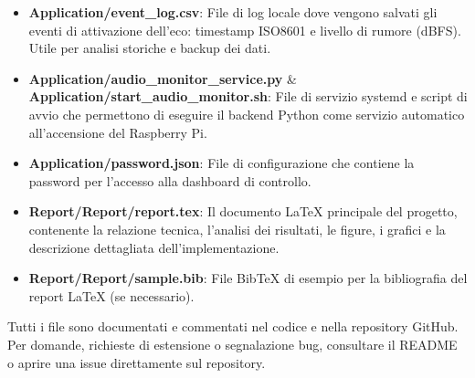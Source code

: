 \documentclass[fleqn,10pt]{SelfArx} %
\begin{document}
\begin{itemize}
	\item \textbf{Application/event\_log.csv}: %
	File di log locale dove vengono salvati gli eventi di attivazione dell'eco: timestamp ISO8601 e livello di rumore (dBFS). Utile per analisi storiche e backup dei dati.	
	
	
	\item \textbf{Application/audio\_monitor\_service.py} \& \textbf{Application/start\_audio\_monitor.sh}:  
	File di servizio systemd e script di avvio che permettono di eseguire il backend Python come servizio automatico all'accensione del Raspberry Pi.	
	
	
	\item \textbf{Application/password.json}:  %
	File di configurazione che contiene la password per l’accesso alla dashboard di controllo.
	
	\item \textbf{Report/Report/report.tex}:  
	Il documento LaTeX principale del progetto, contenente la relazione tecnica, l'analisi dei risultati, le figure, i grafici e la descrizione dettagliata dell'implementazione.
	
	\item \textbf{Report/Report/sample.bib}:  
	File BibTeX di esempio per la bibliografia del report LaTeX (se necessario).
	
\end{itemize}

Tutti i file sono documentati e commentati nel codice e nella repository GitHub.  
Per domande, richieste di estensione o segnalazione bug, consultare il README o aprire una issue direttamente sul repository.

\end{document}
